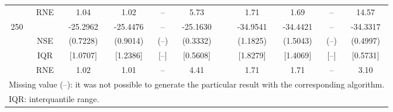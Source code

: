 {{\begin{longtable}{ccccccccccc}
  & RNE &   1.04 &   1.02 &    -- &   5.73 &  &  1.71 &   1.69 &     -- &  14.57   \\ [1ex] 
250 & & -25.2962 & -25.4476 & -- & -25.1630 & & -34.9541 & -34.4421 & -- & -34.3317  \\ 
  & NSE & (0.7228) & (0.9014) & (--) & (0.3332) & & (1.1825) & (1.5043) & (--) & (0.4997)   \\ 
 & IQR & $[$1.0707$]$ & $[$1.2386$]$ & $[$--$]$& $[$0.5608$]$ & & $[$1.8279$]$ & $[$1.4069$]$  &$[$--$]$& $[$0.5731$]$  \\  
  & RNE &   1.02 &   1.01 &    -- &   4.41 &  &  1.71 &   1.71 &     -- &   3.10   \\ [1ex] 
\hline 
  \multicolumn{11}{l}{\footnotesize{Missing value (--): it was not possible to generate the particular result with the corresponding algorithm.}} \\ 
  \multicolumn{11}{l}{\footnotesize{IQR: interquantile range.}} \\ 
\end{longtable} 
} 
} 

\normalsize
